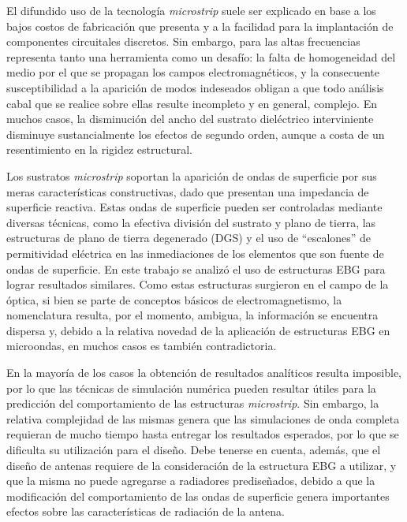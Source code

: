 

El difundido uso de la tecnología \textit{microstrip} suele ser explicado en base a los bajos costos de fabricación que presenta y a la facilidad para la implantación de componentes circuitales discretos. Sin embargo, para las altas frecuencias representa tanto una herramienta como un desafío: la falta de homogeneidad del medio por el que se propagan los campos electromagnéticos, y la consecuente susceptibilidad a la aparición de modos indeseados obligan a que todo análisis cabal que se realice sobre ellas resulte incompleto y en general, complejo. En muchos casos, la disminución del ancho del sustrato dieléctrico interviniente disminuye sustancialmente los efectos de segundo orden, aunque a costa de un resentimiento en la rigidez estructural.

Los sustratos \textit{microstrip} soportan la aparición de ondas de superficie por sus meras características constructivas, dado que presentan una impedancia de superficie reactiva. Estas ondas de superficie pueden ser controladas mediante diversas técnicas, como la efectiva división del sustrato y plano de tierra, las estructuras de plano de tierra degenerado (DGS) y el uso de \enquote{escalones} de permitividad eléctrica en las inmediaciones de los elementos que son fuente de ondas de superficie. En este trabajo se analizó el uso de estructuras EBG para lograr resultados similares. Como estas estructuras surgieron en el campo de la óptica, si bien se parte de conceptos básicos de electromagnetismo, la nomenclatura resulta, por el momento, ambigua, la información se encuentra dispersa y, debido a la relativa novedad de la aplicación de estructuras EBG en microondas, en muchos casos es también contradictoria.

En la mayoría de los casos la obtención de resultados analíticos resulta imposible, por lo que las técnicas de simulación numérica pueden resultar útiles para la predicción del comportamiento de las estructuras \textit{microstrip}. Sin embargo, la relativa complejidad de las mismas genera que las simulaciones de onda completa requieran de mucho tiempo hasta entregar los resultados esperados, por lo que se dificulta su utilización para el diseño. Debe tenerse en cuenta, además, que el diseño de antenas requiere de la consideración de la estructura EBG a utilizar, y que la misma no puede agregarse a radiadores prediseñados, debido a que la modificación del comportamiento de las ondas de superficie genera importantes efectos sobre las características de radiación de la antena.

